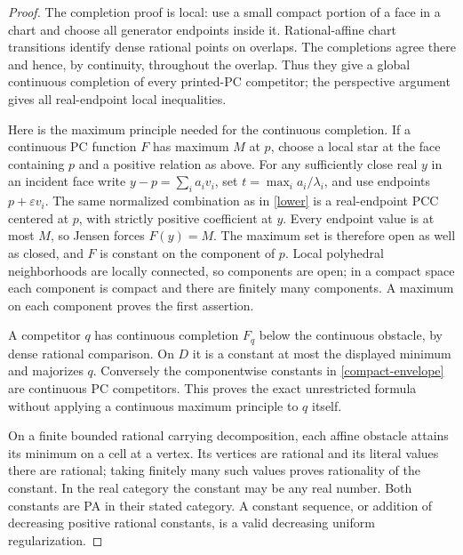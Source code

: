 \documentclass[11pt]{article}
\begin{document}
\begin{proof}
The completion proof is local: use a small compact portion of a face in a chart and choose all generator endpoints inside it. Rational-affine chart transitions identify dense rational points on overlaps. The completions agree there and hence, by continuity, throughout the overlap. Thus they give a global continuous completion of every printed-PC competitor; the perspective argument gives all real-endpoint local inequalities.

Here is the maximum principle needed for the continuous completion. If a continuous PC function $F$ has maximum $M$ at $p$, choose a local star at the face containing $p$ and a positive relation as above. For any sufficiently close real $y$ in an incident face write $y-p=\sum_i a_i v_i$, set $t=\max_i a_i/\lambda_i$, and use endpoints $p+\varepsilon v_i$. The same normalized combination as in \eqref{lower} is a real-endpoint PCC centered at $p$, with strictly positive coefficient at $y$. Every endpoint value is at most $M$, so Jensen forces $F(y)=M$. The maximum set is therefore open as well as closed, and $F$ is constant on the component of $p$. Local polyhedral neighborhoods are locally connected, so components are open; in a compact space each component is compact and there are finitely many components. A maximum on each component proves the first assertion.

A competitor $q$ has continuous completion $F_q$ below the continuous obstacle, by dense rational comparison. On $D$ it is a constant at most the displayed minimum and majorizes $q$. Conversely the componentwise constants in \eqref{compact-envelope} are continuous PC competitors. This proves the exact unrestricted formula without applying a continuous maximum principle to $q$ itself.

On a finite bounded rational carrying decomposition, each affine obstacle attains its minimum on a cell at a vertex. Its vertices are rational and its literal values there are rational; taking finitely many such values proves rationality of the constant. In the real category the constant may be any real number. Both constants are PA in their stated category. A constant sequence, or addition of decreasing positive rational constants, is a valid decreasing uniform regularization.


\end{proof}
\end{document}
